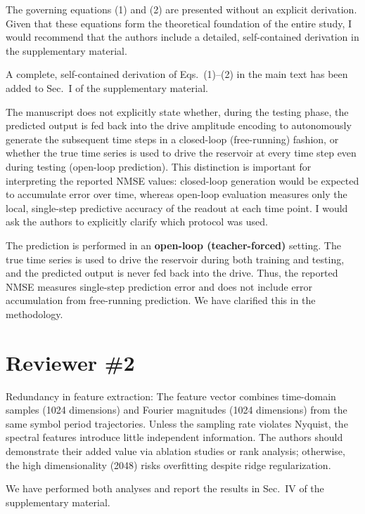 \documentclass{ar2rc}
\begin{document}
\RC \label{rev:1.5}The governing equations (1) and (2) are presented without an explicit derivation. Given that these equations form the theoretical foundation of the entire study, I would recommend that the authors include a detailed, self-contained derivation in the supplementary material.

\AR A complete, self-contained derivation of Eqs.~(1)--(2) in the main text has been added to Sec.~I of the supplementary material.

\RC \label{rev:1.6}The manuscript does not explicitly state whether, during the testing phase, the predicted output is fed back into the drive amplitude encoding to autonomously generate the subsequent time steps in a closed-loop (free-running) fashion, or whether the true time series is used to drive the reservoir at every time step even during testing (open-loop prediction). This distinction is important for interpreting the reported NMSE values: closed-loop generation would be expected to accumulate error over time, whereas open-loop evaluation measures only the local, single-step predictive accuracy of the readout at each time point. I would ask the authors to explicitly clarify which protocol was used.

\AR The prediction is performed in an \textbf{open-loop (teacher-forced)} setting. The true time series is used to drive the reservoir during both training and testing, and the predicted output is never fed back into the drive. Thus, the reported NMSE measures single-step prediction error and does not include error accumulation from free-running prediction. We have clarified this in the methodology.


\section{Reviewer \#2}

\RC \label{rev:2.1}Redundancy in feature extraction: The feature vector combines time-domain samples (1024 dimensions) and Fourier magnitudes (1024 dimensions) from the same symbol period trajectories. Unless the sampling rate violates Nyquist, the spectral features introduce little independent information. The authors should demonstrate their added value via ablation studies or rank analysis; otherwise, the high dimensionality (2048) risks overfitting despite ridge regularization.

\AR We have performed both analyses and report the results in Sec.~IV of the supplementary material.
\end{document}
